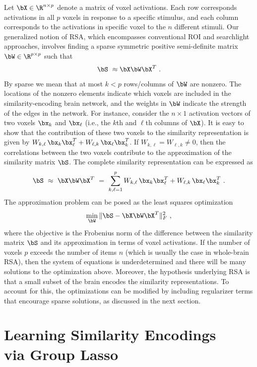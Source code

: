 Let $\bX \in \R^{n\times p}$ denote a matrix of voxel activations.
Each row corresponds activations in all $p$ voxels in response to a specific stimulus, and each column corresponds to the activations in specific voxel to the $n$ different stimuli.  Our generalized notion of RSA,
which encompasses conventional ROI \cite{RSA} and searchlight \cite{searchlight} approaches, involves finding a sparse symmetric positive semi-definite matrix  $\bW\in \R^{p\times p}$ such that
$$\bS \ \approx \bX \bW \bX^T \ .$$
By sparse we mean that at most $k<p$ rows/columns of $\bW$ are nonzero.   The locations of the nonzero elements indicate which voxels are included in the similarity-encoding brain network, and the  weights in $\bW$ indicate the strength of the edges in the network.  For instance, consider the $n\times 1$ activation vectors of two voxels $\bx_k$ and $\bx_{\ell}$ (i.e., the $k$th and $\ell$th columns of $\bX$).  It is easy to show that the contribution of these two voxels to the similarity representation is given by $ W_{k,\ell} \, \bx_k \bx_{\ell}^T + W_{\ell,k} \, \bx_\ell \bx_{k}^T$.  If $W_{k,\ell}=W_{\ell,k}\neq 0$, then the correlations between the two voxels contribute to the approximation of the similarity matrix $\bS$. The complete similarity representation can be expressed as
$$\bS \ \approx \ \bX\bW\bX^T \ = \ \sum_{k,\ell=1}^p W_{k,\ell} \, \bx_k \bx_{\ell}^T + W_{\ell,k} \, \bx_\ell \bx_{k}^T  \ .$$
The approximation problem can be posed as the least squares optimization
$$\min_{\bW} \|\bS-\bX\bW\bX^T\|_F^2 \ , $$
where the objective is the Frobenius norm of the difference between the similarity matrix $\bS$ and its approximation in terms of voxel activations.  If the number of voxels $p$ exceeds the number of items $n$ (which is usually the case in whole-brain RSA), then the system of equations is underdetermined and there will be many solutions to the optimization above.  Moreover, the hypothesis underlying RSA is that a small subset of the brain encodes the similarity representations.  To account for this,
the optimizations can be modified by including regularizer terms that encourage sparse solutions, as discussed in the next section.



\section{Learning Similarity Encodings \\ via Group Lasso}


